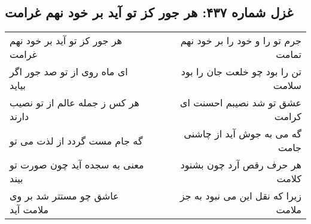\begin{center}
\section*{غزل شماره ۴۳۷: هر جور کز تو آید بر خود نهم غرامت}
\label{sec:0437}
\begin{longtable}{l p{0.5cm} r}
هر جور کز تو آید بر خود نهم غرامت
&&
جرم تو را و خود را بر خود نهم تمامت
\\
ای ماه روی از تو صد جور اگر بیاید
&&
تن را بود چو خلعت جان را بود سلامت
\\
هر کس ز جمله عالم از تو نصیب دارند
&&
عشق تو شد نصیبم احسنت ای کرامت
\\
گه جام مست گردد از لذت می تو
&&
گه می به جوش آید از چاشنی جامت
\\
معنی به سجده آید چون صورت تو بیند
&&
هر حرف رقص آرد چون بشنود کلامت
\\
عاشق چو مستتر شد بر وی ملامت آید
&&
زیرا که نقل این می نبود به جز ملامت
\\
\end{longtable}
\end{center}
